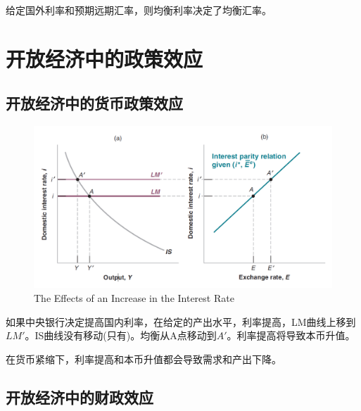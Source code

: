 \documentclass{article}
\begin{document}
给定国外利率和预期远期汇率，则均衡利率决定了均衡汇率。

\section{开放经济中的政策效应}

\subsection{开放经济中的货币政策效应}

\begin{figure}[H] %
	\centering %
	\includegraphics[width=1\textwidth]{19_3} %
	\caption{The Effects of an Increase
		in the Interest Rate} %
	\label{Fig.main4} %
\end{figure}

如果中央银行决定提高国内利率，在给定的产出水平，利率提高，LM曲线上移到$ LM' $。IS曲线没有移动(只有)。均衡从A点移动到$ A' $。利率提高将导致本币升值。

在货币紧缩下，利率提高和本币升值都会导致需求和产出下降。

\subsection{开放经济中的财政效应}
\end{document}
